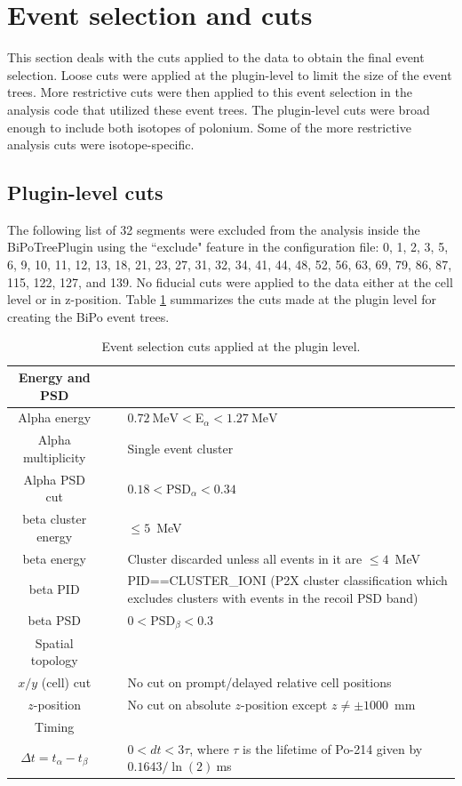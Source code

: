 \section{Event selection and cuts\label{sec:cuts}}
This section deals with the cuts applied to the data to obtain the final event selection. Loose cuts were applied at the plugin-level to limit the size of the event trees. More restrictive cuts were then applied to this event selection in the analysis code that utilized these event trees. The plugin-level cuts were broad enough to include both isotopes of polonium. Some of the more restrictive analysis cuts were isotope-specific.
\subsection{Plugin-level cuts}
The following list of 32 segments were excluded from the analysis inside the BiPoTreePlugin using the ``exclude" feature in the configuration file: 0, 1, 2, 3, 5, 6, 9, 10, 11, 12, 13, 18, 21, 23, 27, 31, 32, 34, 41, 44, 48, 52, 56, 63, 69, 79, 86, 87, 115, 122, 127, and 139. No fiducial cuts were applied to the data either at the cell level or in z-position.
Table \ref{tab:plugincuts} summarizes the cuts made at the plugin level for creating the BiPo event trees.
\begin{table}
\begin{center}
\caption{\label{tab:plugincuts}Event selection cuts applied at the plugin level.}
\begin{tabular}[ht]{c c p{10.5cm}}\hline
Energy and PSD&~&~\\\hline\hline
Alpha energy &\vline& $0.72~\textrm{MeV}<$E$_{\alpha}<1.27~\textrm{MeV}$\\
Alpha multiplicity &\vline& Single event cluster\\
Alpha PSD cut& \vline&$0.18<$PSD$_{\alpha}<0.34$\\
beta cluster energy &\vline& $\leq 5$~MeV\\
beta energy & \vline&Cluster discarded unless all events in it are $\leq 4$~MeV\\
beta PID & \vline&PID==CLUSTER\_IONI (P2X cluster classification which excludes clusters with events in the recoil PSD band)\\
beta PSD & \vline&$0<$PSD$_{\beta}<0.3$\\\hline
Spatial topology&~&~\\\hline\hline
$x/y$ (cell) cut &\vline& No cut on prompt/delayed relative cell positions\\
$z$-position&\vline& No cut on absolute $z$-position except $z\neq \pm1000$~mm\\
Timing&~&~\\\hline\hline
$\Delta t=t_{\alpha}-t_{\beta}$&\vline &$0< dt < 3\tau$, where $\tau$ is the lifetime of Po-214 given by $0.1643/\ln{(2)}~$ms\\\hline

\end{tabular}
\end{center}
\end{table}
